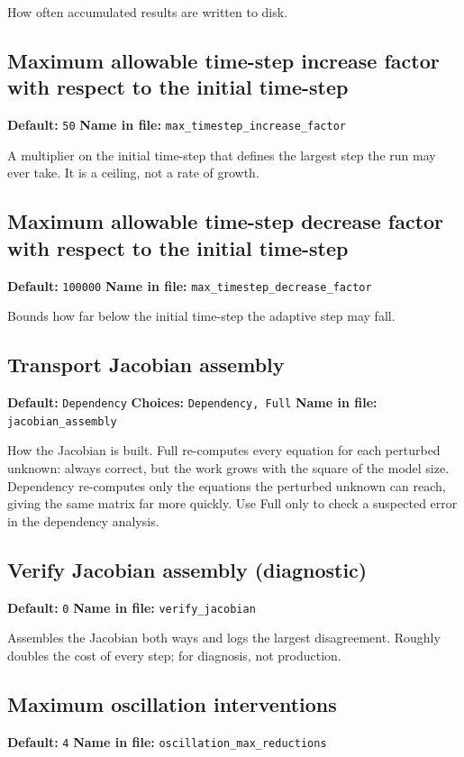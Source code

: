 \documentclass[11pt]{article}
\begin{document}
How often accumulated results are written to disk.
\subsection{Maximum allowable time-step increase factor with respect to the initial time-step}
{\small \textbf{Default:} \texttt{50} \quad\textbullet\quad \textbf{Name in file:} \texttt{max\_\allowbreak{}timestep\_\allowbreak{}increase\_\allowbreak{}factor}}

A multiplier on the initial time-step that defines the largest step the run may ever take. It is a ceiling, not a rate of growth.
\subsection{Maximum allowable time-step decrease factor with respect to the initial time-step}
{\small \textbf{Default:} \texttt{100000} \quad\textbullet\quad \textbf{Name in file:} \texttt{max\_\allowbreak{}timestep\_\allowbreak{}decrease\_\allowbreak{}factor}}

Bounds how far below the initial time-step the adaptive step may fall.
\subsection{Transport Jacobian assembly}
{\small \textbf{Default:} \texttt{Dependency} \quad\textbullet\quad \textbf{Choices:} \texttt{Dependency, Full} \quad\textbullet\quad \textbf{Name in file:} \texttt{jacobian\_\allowbreak{}assembly}}

How the Jacobian is built. Full re-computes every equation for each perturbed unknown: always correct, but the work grows with the square of the model size. Dependency re-computes only the equations the perturbed unknown can reach, giving the same matrix far more quickly. Use Full only to check a suspected error in the dependency analysis.
\subsection{Verify Jacobian assembly (diagnostic)}
{\small \textbf{Default:} \texttt{0} \quad\textbullet\quad \textbf{Name in file:} \texttt{verify\_\allowbreak{}jacobian}}

Assembles the Jacobian both ways and logs the largest disagreement. Roughly doubles the cost of every step; for diagnosis, not production.
\subsection{Maximum oscillation interventions}
{\small \textbf{Default:} \texttt{4} \quad\textbullet\quad \textbf{Name in file:} \texttt{oscillation\_\allowbreak{}max\_\allowbreak{}reductions}}
\end{document}
